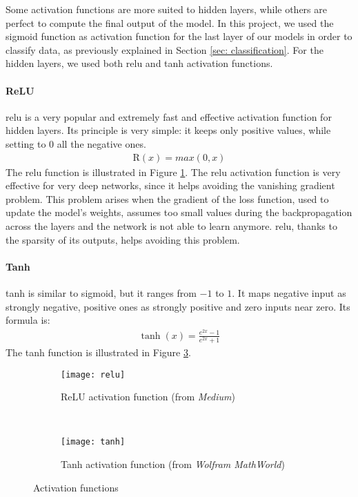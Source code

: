Some activation functions are more suited to hidden layers, while others are perfect to compute the final output of the model. In this project, we used the sigmoid function as activation function for the last layer of our models in order to classify data, as previously explained in Section \ref{sec: classification}. For the hidden layers, we used both \acf{relu} and \acf{tanh} activation functions.

\paragraph{ReLU} \acs{relu} is a very popular and extremely fast and effective activation function for hidden layers. Its principle is very simple: it keeps only positive values, while setting to 0 all the negative ones.
\begin{align}
    \text{R}(x) = max(0, x)
\end{align}
The \acs{relu} function is illustrated in Figure \ref{fig:relu}. The \acs{relu} activation function is very effective for very deep networks, since it helps avoiding the vanishing gradient problem. This problem arises when the gradient of the loss function, used to update the model's weights, assumes too small values during the backpropagation across the layers and the network is not able to learn anymore. \acs{relu}, thanks to the sparsity of its outputs, helps avoiding this problem.

\paragraph{Tanh} \acs{tanh} is similar to sigmoid, but it ranges from $-1$ to $1$. It maps negative input as strongly negative, positive ones as strongly positive and zero inputs near zero. Its formula is:
\begin{align}
    \tanh{(x)} = \frac{e^{2x} - 1}{e^{2x} + 1}
\end{align}
The \acs{tanh} function is illustrated in Figure \ref{fig:tanh}.
\begin{figure}[htbp]
    \centering
    \begin{subfigure}[t]{0.5\textwidth}
		\texttt{[image: relu]}
        \caption{ReLU activation function (from \textit{Medium})}
        \label{fig:relu}
	\end{subfigure}%
	~
	\begin{subfigure}[t]{0.5\textwidth}
		\texttt{[image: tanh]}
        \caption{Tanh activation function (from \textit{Wolfram MathWorld})}
        \label{fig:tanh}
	\end{subfigure}
	\caption{Activation functions}
\end{figure}


